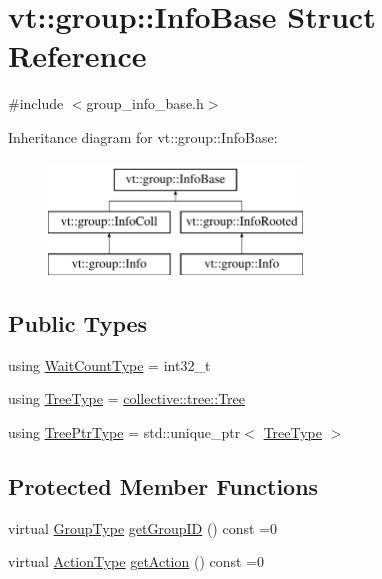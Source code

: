 \hypertarget{structvt_1_1group_1_1_info_base}{}\section{vt\+:\+:group\+:\+:Info\+Base Struct Reference}
\label{structvt_1_1group_1_1_info_base}


{\ttfamily \#include $<$group\+\_\+info\+\_\+base.\+h$>$}

Inheritance diagram for vt\+:\+:group\+:\+:Info\+Base\+:\begin{figure}[H]
\begin{center}
\leavevmode
\includegraphics[height=3.000000cm]{structvt_1_1group_1_1_info_base}
\end{center}
\end{figure}
\subsection*{Public Types}
\begin{DoxyCompactItemize}
\item 
using \hyperlink{structvt_1_1group_1_1_info_base_a0924de8df3a2ec72ebdd499ad8a28abf}{Wait\+Count\+Type} = int32\+\_\+t
\item 
using \hyperlink{structvt_1_1group_1_1_info_base_a96e01b6097ed7b2bc299027d0a7a1b1e}{Tree\+Type} = \hyperlink{structvt_1_1collective_1_1tree_1_1_tree}{collective\+::tree\+::\+Tree}
\item 
using \hyperlink{structvt_1_1group_1_1_info_base_af1111ac71e1ee7a009f00ebece27c3a3}{Tree\+Ptr\+Type} = std\+::unique\+\_\+ptr$<$ \hyperlink{structvt_1_1group_1_1_info_base_a96e01b6097ed7b2bc299027d0a7a1b1e}{Tree\+Type} $>$
\end{DoxyCompactItemize}
\subsection*{Protected Member Functions}
\begin{DoxyCompactItemize}
\item 
virtual \hyperlink{namespacevt_a27b5e4411c9b6140c49100e050e2f743}{Group\+Type} \hyperlink{structvt_1_1group_1_1_info_base_afbb8a9919c924c50be2b99e2dc7cbca2}{get\+Group\+ID} () const =0
\item 
virtual \hyperlink{namespacevt_ae0a5a7b18cc99d7b732cb4d44f46b0f3}{Action\+Type} \hyperlink{structvt_1_1group_1_1_info_base_a643adfea212db8b896b201832bed0445}{get\+Action} () const =0
\end{DoxyCompactItemize}


